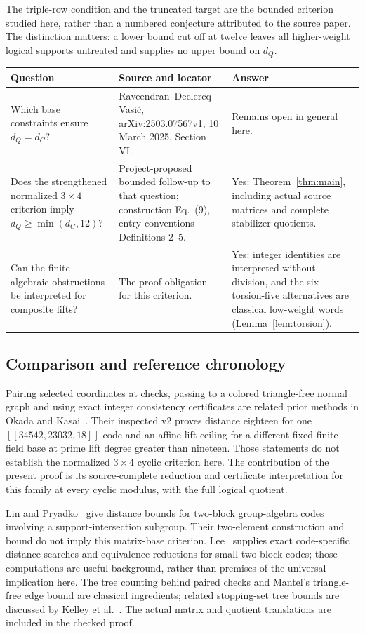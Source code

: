 \documentclass[11pt]{article}
\theoremstyle{definition}\newtheorem{definition}[theorem]{Definition}
\begin{document}
The triple-row condition and the truncated target are the bounded criterion
studied here, rather than a numbered conjecture attributed to the source
paper. The distinction matters: a lower bound cut off at twelve leaves all
higher-weight logical supports untreated and supplies no upper bound on $d_Q$.

\begin{longtable}{@{}P{.25\textwidth}P{.32\textwidth}P{.37\textwidth}@{}}
\toprule Question & Source and locator & Answer\\\midrule\endhead
Which base constraints ensure $d_Q=d_C$? & Raveendran--Declercq--Vasi\'c,
arXiv:2503.07567v1, 10 March 2025, Section VI. & Remains open in general here.\\[4pt]
Does the strengthened normalized $3\times4$ criterion imply
$d_Q\geq\min(d_C,12)$? & Project-proposed bounded follow-up to that question;
construction Eq.~(9), entry conventions Definitions 2--5. & Yes:
Theorem~\ref{thm:main}, including actual source matrices and complete
stabilizer quotients.\\[4pt]
Can the finite algebraic obstructions be interpreted for composite lifts? &
The proof obligation for this criterion. & Yes: integer identities are
interpreted without division, and the six torsion-five alternatives are
classical low-weight words (Lemma~\ref{lem:torsion}).\\
\bottomrule\end{longtable}

\subsection{Comparison and reference chronology}
Pairing selected coordinates at checks, passing to a colored triangle-free
normal graph and using exact integer consistency certificates are related
prior methods in Okada and Kasai~\cite[Sections 3.4 and 3.7]{OK}.
Their inspected v2 proves distance eighteen for one $[[34542,23032,18]]$
code and an affine-lift ceiling for a different fixed finite-field base at
prime lift degree greater than nineteen. Those statements do not establish
the normalized $3\times4$ cyclic criterion here. The contribution of the
present proof is its source-complete reduction and certificate interpretation
for this family at every cyclic modulus, with the full logical quotient.

Lin and Pryadko~\cite[Section IV.6, Statement 12]{LP} give distance bounds for
two-block group-algebra codes involving a support-intersection subgroup.
Their two-element construction and bound do not imply this matrix-base
criterion. Lee~\cite{Lee} supplies exact code-specific distance searches and
equivalence reductions for small two-block codes; those computations are
useful background, rather than premises of the universal implication here.
The tree counting behind paired checks and Mantel's triangle-free edge bound
are classical ingredients; related stopping-set tree bounds are discussed by
Kelley et al.~\cite{Kelley}. The actual matrix and quotient translations are
included in the checked proof.
\end{document}
